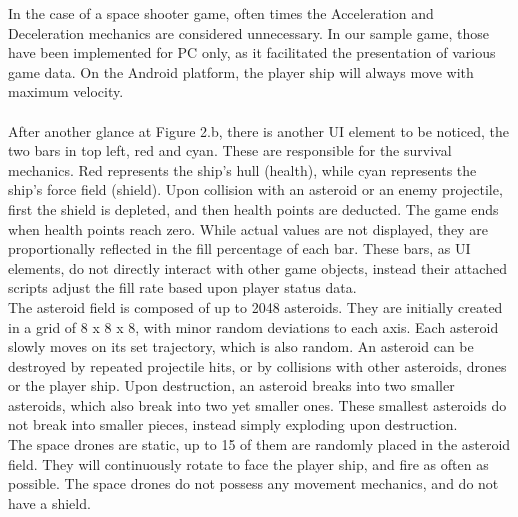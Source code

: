 In the case of a space shooter game, often times the Acceleration and Deceleration mechanics are considered unnecessary. In our sample game, those have been implemented for PC only, as it facilitated the presentation of various game data. On the Android platform, the player ship will always move with maximum velocity. \\ \\
After another glance at Figure 2.b, there is another UI element to be noticed, the two bars in top left, red and cyan. These are responsible for the survival mechanics. Red represents the ship's hull (health), while cyan represents the ship's force field (shield). Upon collision with an asteroid or an enemy projectile, first the shield is depleted, and then health points are deducted. The game ends when health points reach zero. While actual values are not displayed, they are proportionally reflected in the fill percentage of each bar. These bars, as UI elements, do not directly interact with other game objects, instead their attached scripts adjust the fill rate based upon player status data. \\
The asteroid field is composed of up to 2048 asteroids. They are initially created in a grid of 8 x 8 x 8, with minor random deviations to each axis. Each asteroid slowly moves on its set trajectory, which is also random. An asteroid can be destroyed by repeated projectile hits, or by collisions with other asteroids, drones or the player ship. Upon destruction, an asteroid breaks into two smaller asteroids, which also break into two yet smaller ones. These smallest asteroids do not break into smaller pieces, instead simply exploding upon destruction. \\
The space drones are static, up to 15 of them are randomly placed in the asteroid field. They will continuously rotate to face the player ship, and fire as often as possible. The space drones do not possess any movement mechanics, and do not have a shield. 